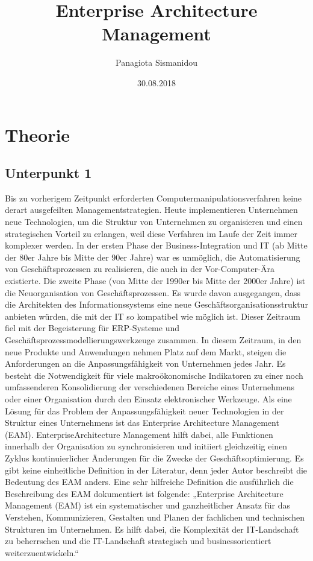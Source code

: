 \documentclass[
	A4paper,
	DIV=9,
	BCOR7mm,
	smallheadings,
	headinclude,
	footinclude,
	headsepline,
	parindent,
	german,
	captions=tableheading,
	abstracton
	]{scrreprt}
\title{Enterprise Architecture Management}
\author{Panagiota Sismanidou}
\date{30.08.2018}
\begin{document}
\maketitle

\tableofcontents

\chapter{Theorie}
\section{Unterpunkt 1}
Bis zu vorherigem Zeitpunkt erforderten Computermanipulationsverfahren keine derart ausgefeilten Managementstrategien. Heute implementieren Unternehmen neue Technologien, um die Struktur von Unternehmen zu organisieren und einen strategischen Vorteil zu erlangen, weil diese Verfahren im Laufe der Zeit immer komplexer werden.	
In der ersten Phase der Business-Integration und IT (ab Mitte der 80er Jahre bis Mitte der 90er Jahre) war es unmöglich, die Automatisierung von Geschäftsprozessen zu realisieren, die auch in der Vor-Computer-Ära existierte.
Die zweite Phase (von Mitte der 1990er bis Mitte der 2000er Jahre) ist die Neuorganisation von Geschäftsprozessen. Es wurde davon ausgegangen, dass die Architekten des Informationssystems eine neue Geschäftsorganisationsstruktur anbieten würden, die mit der IT so kompatibel wie möglich ist. Dieser Zeitraum fiel mit der Begeisterung für ERP-Systeme und Geschäftsprozessmodellierungswerkzeuge zusammen.
In diesem Zeitraum, in den neue Produkte und Anwendungen  nehmen Platz auf dem Markt, steigen die Anforderungen an die Anpassungsfähigkeit von Unternehmen jedes Jahr. Es besteht die Notwendigkeit für viele makroökonomische Indikatoren zu einer noch umfassenderen Konsolidierung der verschiedenen  Bereiche eines Unternehmens oder einer Organisation durch den Einsatz elektronischer Werkzeuge.
Als eine Lösung für das Problem der Anpassungsfähigkeit neuer Technologien in der Struktur eines Unternehmens ist das Enterprise Architecture Management (EAM). EnterpriseArchitecture Management hilft dabei, alle Funktionen innerhalb der Organisation zu synchronisieren und initiiert gleichzeitig einen Zyklus kontinuierlicher Änderungen für die Zwecke der Geschäftsoptimierung.
Es gibt keine einheitliche Definition in der Literatur, denn jeder Autor beschreibt die Bedeutung des EAM anders. Eine sehr hilfreiche Definition die ausführlich die Beschreibung des EAM dokumentiert ist folgende:
„Enterprise Architecture Management (EAM) ist ein systematischer und ganzheitlicher Ansatz für das Verstehen, Kommunizieren, Gestalten und Planen der fachlichen und technischen Strukturen im Unternehmen. Es hilft dabei, die Komplexität der IT-Landschaft zu beherrschen und die IT-Landschaft strategisch und businessorientiert  weiterzuentwickeln.“ \autocite{Hanschke2016}
\end{document}
